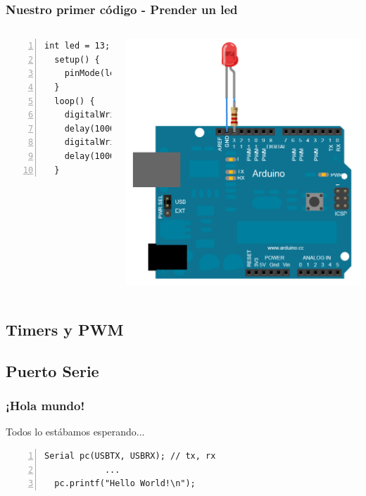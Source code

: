 \documentclass[compress]{beamer}
\begin{document}
\begin{frame}[fragile]
\frametitle{Nuestro primer código - Prender un led}

\begin{columns}
  \begin{Verbatim}[formatcom=\color{red},fontseries=b, numbers=left,numbersep=3pt]
  int led = 13;
  setup() {
    pinMode(led, OUTPUT);
  }
  loop() {
    digitalWrite(led, HIGH);
    delay(1000);
    digitalWrite(led, LOW);
    delay(1000);
  }
  \end{Verbatim} 

   \includegraphics[width=\columnwidth]{./img/arduino_led.png}

\end{columns}
\end{frame}

\subsection{Timers y PWM}

\subsection{Puerto Serie}
\begin{frame}[fragile]
 \frametitle{¡Hola mundo!}
Todos lo estábamos esperando...
\begin{Verbatim}[formatcom=\color{red},fontseries=b, numbers=left,numbersep=3pt]
  Serial pc(USBTX, USBRX); // tx, rx
            ...
  pc.printf("Hello World!\n"); 
\end{Verbatim}
\begin{center}
\end{center}
\end{frame}
\end{document}
